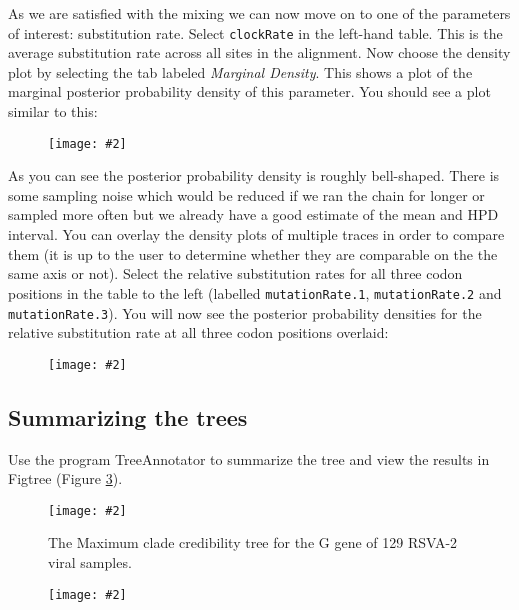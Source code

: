 \documentclass[12pt]{article}
\newcommand{\includeimage}[2][]{%
\texttt{[image: \#2]}
}
\begin{document}
As we are satisfied with the mixing we can now move on to one of the parameters of interest:
substitution rate. Select \texttt{clockRate} in the left-hand table. This is the average substitution rate across all sites in the
alignment. Now choose the density plot by selecting the tab labeled {\it Marginal Density}. This shows a plot of the marginal posterior probability
density of this parameter. You should see a plot similar to this:

\begin{figure}
\centering	
\includeimage[width=\textwidth]{figures/Tracer_density}
\label{fig:Tracer_density}
\end{figure}

As you can see the posterior probability density is roughly bell-shaped. There is some sampling noise which would be
reduced if we ran the chain for longer or sampled more often but we already have a good estimate of the mean and HPD interval. You can overlay
the density plots of multiple traces in order to compare them (it is up to the user to determine whether they are comparable on the the same axis or not). Select the relative substitution rates for all three codon positions in the table to the left (labelled
\texttt{mutationRate.1}, \texttt{mutationRate.2} and \texttt{mutationRate.3}). You will now see the posterior probability densities for the relative
substitution rate at all three codon positions overlaid:

\begin{figure}
\centering	
\includeimage[width=\textwidth]{figures/Tracer_relativeRates}
\label{fig:Tracer_relativeRates}
\end{figure}

\subsection*{Summarizing the trees}

Use the program TreeAnnotator to summarize the tree and view the results in Figtree (Figure \ref{fig:RSV2tree}).

\begin{figure}
\centering	
\includeimage[width=\textwidth]{figures/RSV2_mcc_tree}
\caption{The Maximum clade credibility tree for the G gene of 129 RSVA-2 viral samples. }
\label{fig:RSV2tree}
\end{figure}

\begin{figure}
\centering	
\includeimage[width=\textwidth]{figures/DensiTree}
\label{fig:DensiTree}
\end{figure}
\end{document}
